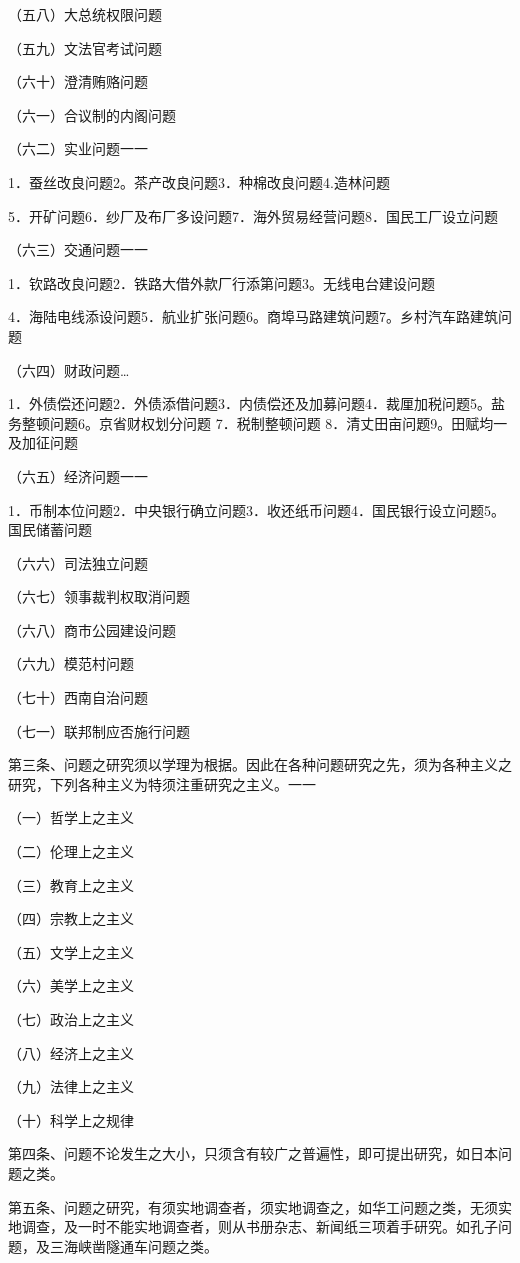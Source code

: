 （五八）大总统权限问题

（五九）文法官考试问题

（六十）澄清贿赂问题

（六一）合议制的内阁问题

（六二）实业问题一一

1．蚕丝改良问题2。茶产改良问题3．种棉改良问题4.造林问题

5．开矿问题6．纱厂及布厂多设问题7．海外贸易经营问题8．国民工厂设立问题

（六三）交通问题一一

1．钦路改良问题2．铁路大借外款厂行添第问题3。无线电台建设问题

4．海陆电线添设问题5．航业扩张问题6。商埠马路建筑问题7。乡村汽车路建筑问题

（六四）财政问题…

1．外债偿还问题2．外债添借问题3．内债偿还及加募问题4．裁厘加税问题5。盐务整顿问题6。京省财权划分问题 7．税制整顿问题 8．清丈田亩问题9。田赋均一及加征问题

（六五）经济问题一一

1．币制本位问题2．中央银行确立问题3．收还纸币问题4．国民银行设立问题5。国民储蓄问题

（六六）司法独立问题

（六七）领事裁判权取消问题

（六八）商市公园建设问题

（六九）模范村问题

（七十）西南自治问题

（七一）联邦制应否施行问题

第三条、问题之研究须以学理为根据。因此在各种问题研究之先，须为各种主义之研究，下列各种主义为特须注重研究之主义。一一

（一）哲学上之主义

（二）伦理上之主义

（三）教育上之主义

（四）宗教上之主义

（五）文学上之主义

（六）美学上之主义

（七）政治上之主义

（八）经济上之主义

（九）法律上之主义

（十）科学上之规律

第四条、问题不论发生之大小，只须含有较广之普遍性，即可提出研究，如日本问题之类。

第五条、问题之研究，有须实地调查者，须实地调查之，如华工问题之类，无须实地调查，及一时不能实地调查者，则从书册杂志、新闻纸三项着手研究。如孔子问题，及三海峡凿隧通车问题之类。


